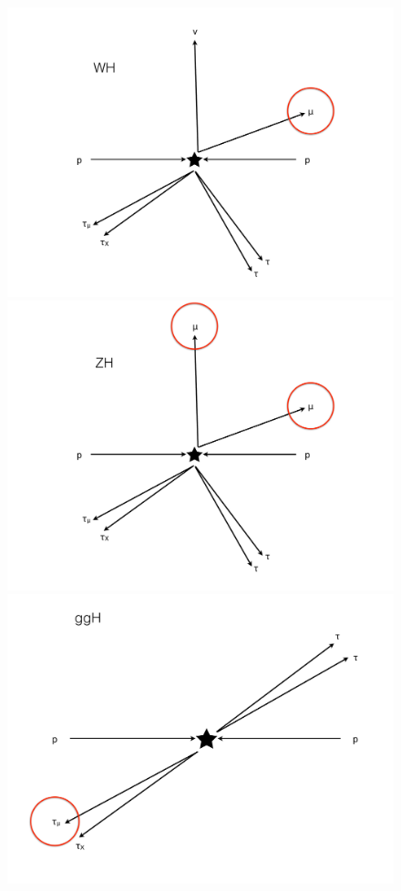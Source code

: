 \begin{figure}[hbtp]
  \begin{center}
    \includegraphics[width=\cmsFigWidth]{figures/WH_trigger}
    \includegraphics[width=\cmsFigWidth]{figures/ZH_trigger}
    \includegraphics[width=\cmsFigWidth]{figures/ggH_trigger}

\end{center}
\end{figure}
